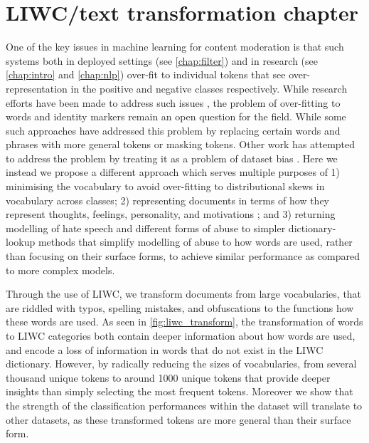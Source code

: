 \ifpdf
    \graphicspath{{Chapter5/Figs/Raster/}{Chapter5/Figs/PDF/}{Chapter5/Figs/}}
\else
    \graphicspath{{Chapter5/Figs/Vector/}{Chapter5/Figs/}}
\fi

\chapter{LIWC/text transformation chapter}\label{chap:liwc}

One of the key issues in machine learning for content moderation is that such systems both in deployed settings (see \autoref{chap:filter}) and in research (see \autoref{chap:intro} and \autoref{chap:nlp}) over-fit to individual tokens that see over-representation in the positive and negative classes respectively. While research efforts have been made to address such issues \cite{CITE: cite papers that try to address overfitting}, the problem of over-fitting to words and identity markers remain an open question for the field. While some such approaches have addressed this problem by replacing certain words and phrases with more general tokens \cite{CITE: Replacing token papers} or masking \cite{CITE: Masking token paper} tokens. Other work has attempted to address the problem by treating it as a problem of dataset bias \cite{CITE: Bias papers}. Here we instead we propose a different approach which serves multiple purposes of 1) minimising the vocabulary to avoid over-fitting to distributional skews in vocabulary across classes; 2) representing documents in terms of how they represent thoughts, feelings, personality, and motivations \cite{LIWC:2015}; and 3) returning modelling of hate speech and different forms of abuse to simpler dictionary-lookup methods that simplify modelling of abuse to how words are used, rather than focusing on their surface forms, to achieve similar performance as compared to more complex models.

Through the use of LIWC, we transform documents from large vocabularies, that are riddled with typos, spelling mistakes, and obfuscations to the functions how these words are used. As seen in \autoref{fig:liwc_transform}, the transformation of words to LIWC categories both contain deeper information about how words are used, and encode a loss of information in words that do not exist in the LIWC dictionary. However, by radically reducing the sizes of vocabularies, from several thousand unique tokens to around 1000 unique tokens that provide deeper insights than simply selecting the most frequent tokens. Moreover we show that the strength of the classification performances within the dataset will translate to other datasets, as these transformed tokens are more general than their surface form.

